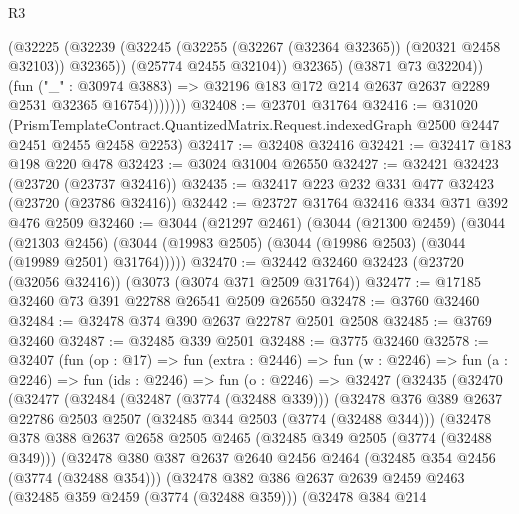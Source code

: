\begin{lexlean}{R3}
\begin{coremodule}
                    (@32225
                      (@32239
                        (@32245 (@32255 (@32267 (@32364 @32365)) (@20321 @2458 @32103)) @32365))
                      (@25774 @2455 @32104))
                    @32365)
                  (@3871 @73 @32204))
                (fun ("_" : @30974 @3883) =>
                @32196 @183 @172 @214 @2637 @2637 @2289 @2531 @32365 @16754)))))))
@32408 := @23701 @31764
@32416 := @31020
    (PrismTemplateContract.QuantizedMatrix.Request.indexedGraph @2500 @2447 @2451 @2455 @2458 @2253)
@32417 := @32408 @32416
@32421 := @32417 @183 @198 @220 @478
@32423 := @3024 @31004 @26550
@32427 := @32421 @32423 (@23720 (@23737 @32416))
@32435 := @32417 @223 @232 @331 @477 @32423 (@23720 (@23786 @32416))
@32442 := @23727 @31764 @32416 @334 @371 @392 @476 @2509
@32460 := @3044
    (@21297 @2461)
    (@3044
      (@21300 @2459)
      (@3044
        (@21303 @2456)
        (@3044 (@19983 @2505) (@3044 (@19986 @2503) (@3044 (@19989 @2501) @31764)))))
@32470 := @32442 @32460 @32423 (@23720 (@32056 @32416)) (@3073 (@3074 @371 @2509 @31764))
@32477 := @17185 @32460 @73 @391 @22788 @26541 @2509 @26550
@32478 := @3760 @32460
@32484 := @32478 @374 @390 @2637 @22787 @2501 @2508
@32485 := @3769 @32460
@32487 := @32485 @339 @2501
@32488 := @3775 @32460
@32578 := @32407
    (fun (op : @17) =>
    fun (extra : @2446) =>
    fun (w : @2246) =>
    fun (a : @2246) =>
    fun (ids : @2246) =>
    fun (o : @2246) =>
    @32427
      (@32435
        (@32470
          (@32477
            (@32484
              (@32487 (@3774 (@32488 @339)))
              (@32478
                @376
                @389
                @2637
                @22786
                @2503
                @2507
                (@32485 @344 @2503 (@3774 (@32488 @344)))
                (@32478
                  @378
                  @388
                  @2637
                  @2658
                  @2505
                  @2465
                  (@32485 @349 @2505 (@3774 (@32488 @349)))
                  (@32478
                    @380
                    @387
                    @2637
                    @2640
                    @2456
                    @2464
                    (@32485 @354 @2456 (@3774 (@32488 @354)))
                    (@32478
                      @382
                      @386
                      @2637
                      @2639
                      @2459
                      @2463
                      (@32485 @359 @2459 (@3774 (@32488 @359)))
                      (@32478
                        @384
                        @214

\end{coremodule}
\end{lexlean}
